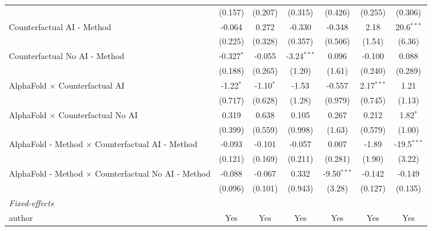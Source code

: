 \begin{tabular}{lcccccc}
                                                              & (0.157)      & (0.207)     & (0.315)       & (0.426)       & (0.255)      & (0.306)\\   
   Counterfactual AI - Method                                 & -0.064       & 0.272       & -0.330        & -0.348        & 2.18         & 20.6$^{***}$\\   
                                                              & (0.225)      & (0.328)     & (0.357)       & (0.506)       & (1.54)       & (6.36)\\   
   Counterfactual No AI - Method                              & -0.327$^{*}$ & -0.055      & -3.24$^{***}$ & 0.096         & -0.100       & 0.088\\   
                                                              & (0.188)      & (0.265)     & (1.20)        & (1.61)        & (0.240)      & (0.289)\\   
   AlphaFold $\times$ Counterfactual AI                       & -1.22$^{*}$  & -1.10$^{*}$ & -1.53         & -0.557        & 2.17$^{***}$ & 1.21\\   
                                                              & (0.717)      & (0.628)     & (1.28)        & (0.979)       & (0.745)      & (1.13)\\   
   AlphaFold $\times$ Counterfactual No AI                    & 0.319        & 0.638       & 0.105         & 0.267         & 0.212        & 1.82$^{*}$\\   
                                                              & (0.399)      & (0.559)     & (0.998)       & (1.63)        & (0.579)      & (1.00)\\   
   AlphaFold - Method $\times$ Counterfactual AI - Method     & -0.093       & -0.101      & -0.057        & 0.007         & -1.89        & -19.5$^{***}$\\   
                                                              & (0.121)      & (0.169)     & (0.211)       & (0.281)       & (1.90)       & (3.22)\\   
   AlphaFold - Method $\times$ Counterfactual No AI - Method  & -0.088       & -0.067      & 0.332         & -9.50$^{***}$ & -0.142       & -0.149\\   
                                                              & (0.096)      & (0.101)     & (0.943)       & (3.28)        & (0.127)      & (0.135)\\   
   \midrule
   \emph{Fixed-effects}\\
   author                                                     & Yes          & Yes         & Yes           & Yes           & Yes          & Yes\\  

\end{tabular}
